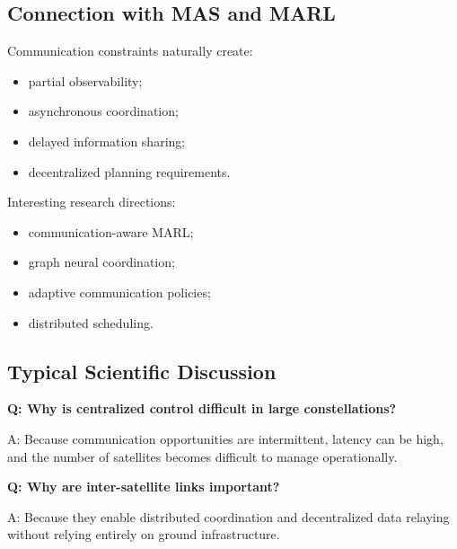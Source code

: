 \documentclass[10pt,a4paper,twocolumn]{article}
\begin{document}

\subsection{Connection with MAS and MARL}

Communication constraints naturally create:
\begin{itemize}
    \item partial observability;
    \item asynchronous coordination;
    \item delayed information sharing;
    \item decentralized planning requirements.
\end{itemize}

Interesting research directions:
\begin{itemize}
    \item communication-aware MARL;
    \item graph neural coordination;
    \item adaptive communication policies;
    \item distributed scheduling.
\end{itemize}


\subsection{Typical Scientific Discussion}

\begin{questionbox}
    \textbf{Q: Why is centralized control difficult in large constellations?}

    A: Because communication opportunities are intermittent, latency can be high, and the number of satellites becomes difficult to manage operationally.
\end{questionbox}

\begin{questionbox}
    \textbf{Q: Why are inter-satellite links important?}

    A: Because they enable distributed coordination and decentralized data relaying without relying entirely on ground infrastructure.
\end{questionbox}
\end{document}

